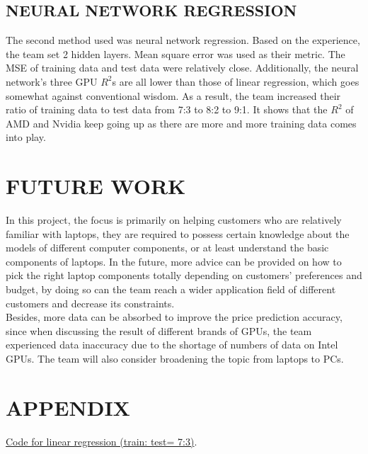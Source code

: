 \documentclass{scrartcl}
\begin{document}
\subsection{NEURAL NETWORK REGRESSION}
The second method used was neural network regression. Based on the experience, the team set 2 hidden layers. Mean square error was used as their metric. The MSE of training data and test data were relatively close. Additionally, the neural network's three GPU $R^2$s are all lower than those of linear regression, which goes somewhat against conventional wisdom. As a result, the team increased their ratio of training data to test data from 7:3 to 8:2 to 9:1. It shows that the $R^2$ of AMD and Nvidia keep going up as there are more and more training data comes into play.\\






\section{FUTURE WORK}

In this project, the focus is primarily on helping customers who are relatively familiar with laptops, they are required to possess certain knowledge about the models of different computer components, or at least understand the basic components of laptops. In the future, more advice can be provided on how to pick the right laptop components totally depending on customers' preferences and budget, by doing so can the team reach a wider application field of different customers and decrease its constraints.\\

Besides, more data can be absorbed to improve the price prediction accuracy, since when discussing the result of different brands of GPUs, the team experienced data inaccuracy due to the shortage of numbers of data on Intel GPUs. The team will also consider broadening the topic from laptops to PCs.\\


\newpage
\singlespacing




\newpage
\appendix
\section{APPENDIX}

\href{https://github.com/zw2788/MECE4520\_project/blob/main/MECE\_4520\_LaptopPrediction/Method\_Linear.ipynb}{Code for linear regression (train: test= 7:3)}.\\
\end{document}
